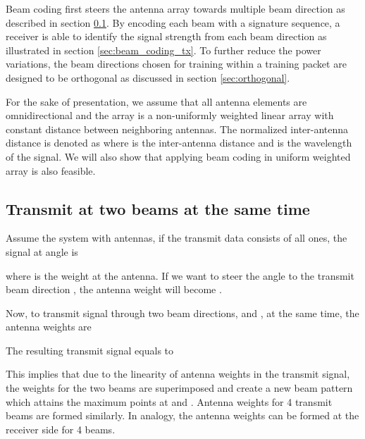 \documentclass[10pt,conference]{IEEEtran}
\begin{document}
Beam coding first steers the antenna array towards multiple beam direction as described in section \ref{sec:sametime}. By encoding each beam with a signature sequence, a receiver is able to identify the signal strength from each beam direction as illustrated in section \ref{sec:beam_coding_tx}. To further reduce the power variations, the beam directions chosen for training within a training packet are designed to be orthogonal as discussed in section \ref{sec:orthogonal}.


For the sake of presentation, we assume that all antenna elements are
omnidirectional and the array is a non-uniformly weighted linear array with constant
distance between neighboring antennas. The normalized
inter-antenna distance
is denoted as  where  is the inter-antenna distance
and  is
the wavelength of the signal. We will also show that applying beam coding in uniform weighted array is also feasible.

\subsection{Transmit at two beams at the same time} \label{sec:sametime}
Assume the system with  antennas, if the transmit data consists of all ones,
the signal at angle  is
\begin{small}

\end{small}
where  is the weight at the  antenna. If we want to steer
the angle to the transmit beam direction , the antenna weight will
become .

Now, to transmit signal through two beam directions,  and , at
the same time, the antenna weights are
\begin{small}

\end{small}
The resulting transmit signal equals to
\begin{small}

\end{small}
This implies that due to the linearity of antenna weights in the transmit
signal, the weights for the two beams are superimposed and create a new beam pattern which attains the maximum points at  and
. Antenna weights for 4 transmit beams are formed similarly. In analogy, the antenna weights can be formed at the receiver side for
4 beams.
\end{document}
